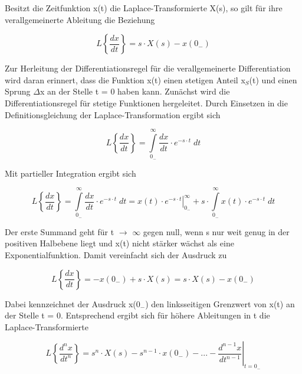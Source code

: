 \noindent Besitzt die Zeitfunktion x(t) die Laplace-Transformierte X(s), so gilt für ihre verallgemeinerte Ableitung die Beziehung

\begin{equation}\label{eq:foursixtyeight}
L\left\{\frac{dx}{dt} \right\}=s\cdot X\left(s\right)-x\left(0_{-} \right)
\end{equation}

\noindent Zur Herleitung der Differentiationsregel für die verallgemeinerte Differentiation wird daran erinnert, dass die Funktion x(t) einen stetigen Anteil x$_{S}$(t) und einen Sprung $\Delta$x an der Stelle t = 0 haben kann. Zun\"{a}chst wird die Differentiationsregel für stetige Funktionen hergeleitet. Durch Einsetzen in die Definitionsgleichung der Laplace-Transformation ergibt sich

\begin{equation}\label{eq:foursixtynine}
L\left\{\frac{dx}{dt} \right\}=\int\limits _{0_{-} }^{\infty }\frac{dx}{dt}  \cdot e^{-s\cdot t} \;dt
\end{equation}

\noindent Mit partieller Integration ergibt sich 

\begin{equation}\label{eq:fourseventy}
L\left\{\frac{dx}{dt} \right\}=\int\limits _{0_{-} }^{\infty }\frac{dx}{dt}  \cdot e^{-s\cdot t} \;dt=\left. x\left(t\right)\cdot e^{-s\cdot t} \right|_{0_{-} }^{\infty } +s\cdot \int\limits _{0_{-} }^{\infty }x\left(t\right)\cdot e^{-s\cdot t} \;dt
\end{equation}

\noindent Der erste Summand geht für t $\rightarrow$ $\mathrm{\infty}$ gegen null, wenn s nur weit genug in der positiven Halbebene liegt und x(t) nicht stärker wächst als eine Exponentialfunktion. Damit vereinfacht sich der Ausdruck zu

\begin{equation}\label{eq:fourseventyone}
L\left\{\frac{dx}{dt} \right\}=-x\left(0_{-} \right)+s\cdot X\left(s\right)=s\cdot X\left(s\right)-x\left(0_{-} \right)
\end{equation}

\noindent Dabei kennzeichnet der Ausdruck x(0$_{-}$) den linksseitigen Grenzwert von x(t) an der Stelle t = 0. Entsprechend ergibt sich für höhere Ableitungen in t die Laplace-Transformierte

\begin{equation}\label{eq:fourseventytwo}
L\left\{\frac{d^{n} x}{dt^{n} } \right\}=s^{n} \cdot X\left(s\right)-s^{n-1} \cdot x\left(0_{-} \right)-...-\left. \frac{d^{n-1} x}{dt^{n-1} } \right|_{t=0_{-} }
\end{equation}

